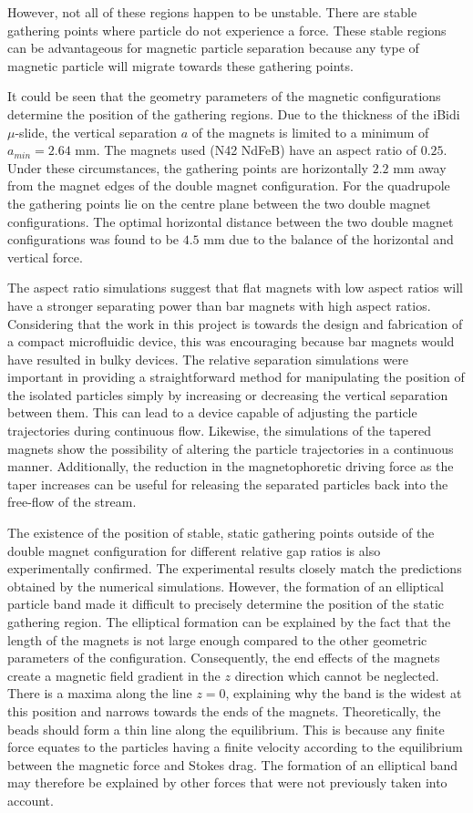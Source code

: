However, not all of these regions happen to be unstable. There are stable gathering points where particle do not experience a force. These stable regions can be advantageous for magnetic particle separation because any type of magnetic particle will migrate towards these gathering points.

It could be seen that the geometry parameters of the magnetic configurations determine the position of the gathering regions. Due to the thickness of the iBidi $\mu$-slide, the vertical separation $a$ of the magnets is limited to a minimum of $a_{min} = 2.64$ mm. The magnets used (N42 NdFeB) have an aspect ratio of $0.25$. Under these circumstances, the gathering points are horizontally $2.2$ mm away from the magnet edges of the double magnet configuration. For the quadrupole the gathering points lie on the centre plane between the two double magnet configurations. The optimal horizontal distance between the two double magnet configurations was found to be $4.5$ mm due to the balance of the horizontal and vertical force.

The aspect ratio simulations suggest that flat magnets with low aspect ratios will have a stronger separating power than bar magnets with high aspect ratios. Considering that the work in this project is towards the design and fabrication of a compact microfluidic device, this was encouraging because bar magnets would have resulted in bulky devices. The relative separation simulations were important in providing a straightforward method for manipulating the position of the isolated particles simply by increasing or decreasing the vertical separation between them. This can lead to a device capable of adjusting the particle trajectories during continuous flow. Likewise, the simulations of the tapered magnets show the possibility of altering the particle trajectories in a continuous manner. Additionally, the reduction in the magnetophoretic driving force as the taper increases can be useful for releasing the separated particles back into the free-flow of the stream.

The existence of the position of stable, static gathering points outside of the double magnet configuration for different relative gap ratios is also experimentally confirmed. The experimental results closely match the predictions obtained by the numerical simulations. However, the formation of an elliptical particle band made it difficult to precisely determine the position of the static gathering region. The elliptical formation can be explained by the fact that the length of the magnets is not large enough compared to the other geometric parameters of the configuration. Consequently, the end effects of the magnets create a magnetic field gradient in the $z$ direction which cannot be neglected. There is a maxima along the line $z=0$, explaining why the band is the widest at this position and narrows towards the ends of the magnets. Theoretically, the beads should form a thin line along the equilibrium. This is because any finite force equates to the particles having a finite velocity according to the equilibrium between the magnetic force and Stokes drag. The formation of an elliptical band may therefore be explained by other forces that were not previously taken into account.

